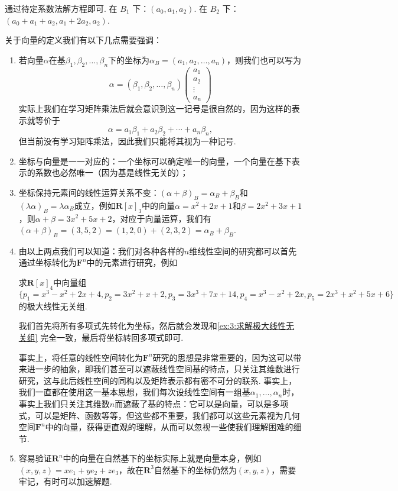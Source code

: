 \begin{solution}
    通过待定系数法解方程即可.
    在 $B_1$ 下：$(a_0, a_1, a_2)$. 在 $B_2$ 下：$(a_0 + a_1 + a_2, a_1 + 2a_2, a_2)$.
\end{solution}
关于向量的定义我们有以下几点需要强调：
\begin{enumerate}
    \item 若向量$\alpha$在基$\beta_1,\beta_2,\ldots,\beta_n$下的坐标为$\alpha_B=(a_1,a_2,\ldots,a_n)$，则我们也可以写为
          \[\alpha=(\beta_1, \beta_2, \ldots, \beta_n)\begin{pmatrix} a_1 \\ a_2 \\ \vdots \\ a_n \end{pmatrix}\]
          实际上我们在学习矩阵乘法后就会意识到这一记号是很自然的，因为这样的表示就等价于
          \[\alpha=a_1\beta_1+a_2\beta_2+\cdots+a_n\beta_n,\]
          但当前没有学习矩阵乘法，因此我们只能将其视为一种记号.

    \item 坐标与向量是一一对应的：一个坐标可以确定唯一的向量，一个向量在基下表示的系数也必然唯一（因为基是线性无关的）；

    \item 坐标保持元素间的线性运算关系不变：$(\alpha+\beta)_B=\alpha_B+\beta_B$和$(\lambda\alpha)_B=\lambda\alpha_B$成立，例如$\mathbf{R}[x]_3$中的向量$\alpha=x^2+2x+1$和$\beta=2x^2+3x+1$，则$\alpha+\beta=3x^2+5x+2$，对应于向量运算，我们有$(\alpha+\beta)_B=(3,5,2)=(1,2,0)+(2,3,2)=\alpha_B+\beta_B$.

    \item 由以上两点我们可以知道：我们对各种各样的$n$维线性空间的研究都可以首先通过坐标转化为$\mathbf{F}^n$中的元素进行研究，例如
          \begin{example}\label{ex:3:转化为坐标}
              求$\mathbf{R}[x]_4$中向量组$\{p_1=x^3-x^2+2x+4,p_2=3x^2+x+2,p_3=3x^3+7x+14,p_4=x^3-x^2+2x,p_5=2x^3+x^2+5x+6\}$的极大线性无关组.
          \end{example}
          \begin{solution}
              我们首先将所有多项式先转化为坐标，然后就会发现和\autoref{ex:3:求解极大线性无关组} 完全一致，最后将坐标转回多项式即可.
          \end{solution}

          事实上，将任意的线性空间转化为$\mathbf{F}^n$研究的思想是非常重要的，因为这可以带来进一步的抽象，即我们甚至可以遮蔽线性空间基的特点，只关注其维数进行研究，这与此后线性空间的同构以及矩阵表示都有密不可分的联系. 事实上，我们一直都在使用这一基本思想，我们每次设线性空间有一组基$\alpha_1,\ldots,\alpha_n$时，事实上我们只关注其维数$n$而遮蔽了基的特点：它可以是向量，可以是多项式，可以是矩阵、函数等等，但这些都不重要，我们都可以这些元素视为几何空间$\mathbf{F}^n$中的向量，获得更直观的理解，从而可以忽视一些使我们理解困难的细节.

    \item 容易验证$\mathbf{R}^n$中的向量在自然基下的坐标实际上就是向量本身，例如$(x,y,z)=xe_1+ye_2+ze_3$，故在$\mathbf{R}^3$自然基下的坐标仍然为$(x,y,z)$，需要牢记，有时可以加速解题.
\end{enumerate}

